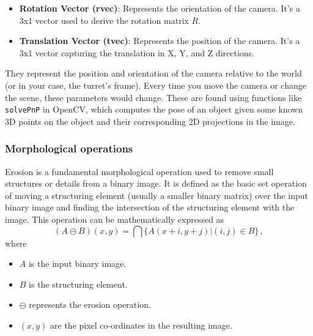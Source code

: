 \begin{itemize}
    \item \textbf{Rotation Vector (rvec)}: Represents the orientation of the camera. It's a 3x1 vector used to derive the rotation matrix $ R $.

    \item \textbf{Translation Vector (tvec)}: Represents the position of the camera. It's a 3x1 vector capturing the translation in X, Y, and Z directions.
\end{itemize}

They represent the position and orientation of the camera relative to the world (or in your case, the turret's frame). Every time you move the camera or change the scene, these parameters would change. These are found using functions like \verb|solvePnP| in OpenCV, which computes the pose of an object given some known 3D points on the object and their corresponding 2D projections in the image.

\subsubsection{Morphological operations}
\label{subsubsec:morphological_operations}
Erosion is a fundamental morphological operation used to remove small structures or details from a binary image. It is defined as the basic set operation of moving a structuring element (usually a smaller binary matrix) over the input binary image and finding the intersection of the structuring element with the image. This operation can be mathematically expressed as
\begin{equation}
    (A \ominus B)(x, y) = \bigcap \{A(x + i, y + j) | (i, j) \in B\}\,,
    \label{eq:erosion}
\end{equation}
where
\begin{itemize}
    \item $A$ is the input binary image.
    \item $B$ is the structuring element.
    \item $\ominus$ represents the erosion operation.
    \item $(x, y)$ are the pixel co-ordinates in the resulting image.
\end{itemize}

